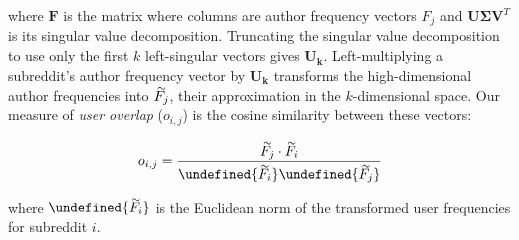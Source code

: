 \documentclass[letterpaper]{article}\usepackage[]{graphicx}\usepackage[]{color}
\renewcommand{\widetilde}[1]{\mathbin{%
    \stackrel{\sim}{\smash{#1} \rule{0pt}{1.15ex}}%
    }}
\let\norm\undefined %
\DeclarePairedDelimiter\norm{\lVert}{\rVert}
\begin{document}
\noindent where $\mathbf{F}$ is the matrix where columns are author frequency vectors $F_j$ and $\mathbf{U \Sigma V}^T$ is its singular value decomposition. Truncating the singular value decomposition to use only the first $k$ left-singular vectors gives $\mathbf{U_k}$. Left-multiplying a subreddit's author frequency vector by $\mathbf{U_k}$ transforms the high-dimensional author frequencies into $\widetilde{F_j}$, their approximation in the $k$-dimensional space. 
Our measure of \textit{user overlap} ($o_{i,j}$) is the cosine similarity between these vectors: %






\begin{equation}
    o_{i,j} = \frac{\widetilde{F_{j}} \cdot \widetilde{F_{i}}} {\norm{\widetilde{F_i}} \norm{\widetilde{F_j}}} \label{eq:user.overlap}
\end{equation}

\noindent where $\norm{\widetilde{F_i}}$ is the Euclidean norm of the transformed user frequencies for subreddit $i$.  







\end{document}
